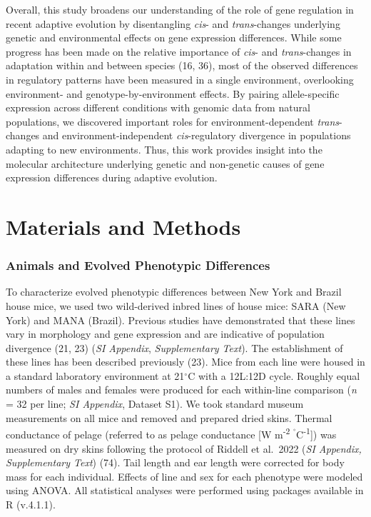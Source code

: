 \documentclass[9pt,twocolumn,twoside,lineno]{pnas-new}
\begin{document}
Overall, this study broadens our understanding of the role of gene
regulation in recent adaptive evolution by disentangling \emph{cis}- and
\emph{trans}-changes underlying genetic and environmental effects on
gene expression differences. While some progress has been made on the
relative importance of \emph{cis}- and \emph{trans}-changes in
adaptation within and between species (16, 36), most of the observed
differences in regulatory patterns have been measured in a single
environment, overlooking environment- and genotype-by-environment
effects. By pairing allele-specific expression across different
conditions with genomic data from natural populations, we discovered
important roles for environment-dependent \emph{trans}-changes and
environment-independent \emph{cis}-regulatory divergence in populations
adapting to new environments. Thus, this work provides insight into the
molecular architecture underlying genetic and non-genetic causes of gene
expression differences during adaptive evolution.

\hypertarget{materials-and-methods}{%
\section*{Materials and Methods}\label{materials-and-methods}}

\hypertarget{animals-and-evolved-phenotypic-differences}{%
\subsubsection*{Animals and Evolved Phenotypic
Differences}\label{animals-and-evolved-phenotypic-differences}}

To characterize evolved phenotypic differences between New York and
Brazil house mice, we used two wild-derived inbred lines of house mice:
SARA (New York) and MANA (Brazil). Previous studies have demonstrated
that these lines vary in morphology and gene expression and are
indicative of population divergence (21, 23) (\emph{SI Appendix},
\emph{Supplementary Text}). The establishment of these lines has been
described previously (23). Mice from each line were housed in a standard
laboratory environment at 21\(^{\circ}\)C with a 12L:12D cycle. Roughly
equal numbers of males and females were produced for each within-line
comparison (\emph{n} = 32 per line; \emph{SI Appendix}, Dataset S1). We
took standard museum measurements on all mice and removed and prepared
dried skins. Thermal conductance of pelage (referred to as pelage
conductance {[}W m\textsuperscript{-2}
\textsuperscript{\(^{\circ}\)}C\textsuperscript{-1}{]}) was measured on
dry skins following the protocol of Riddell et al.~2022 (\emph{SI
Appendix, Supplementary Text}) (74). Tail length and ear length were
corrected for body mass for each individual. Effects of line and sex for
each phenotype were modeled using ANOVA. All statistical analyses were
performed using packages available in R (v.4.1.1).
\end{document}
